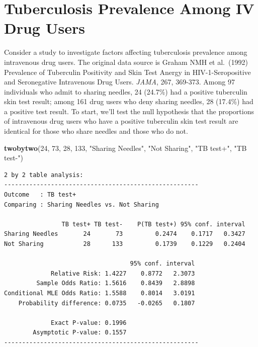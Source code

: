 \documentclass[
]{book}
\newenvironment{Shaded}{\begin{snugshade}}{\end{snugshade}}
\newcommand{\DecValTok}[1]{\textcolor[rgb]{0.00,0.00,0.81}{#1}}
\newcommand{\KeywordTok}[1]{\textcolor[rgb]{0.13,0.29,0.53}{\textbf{#1}}}
\newcommand{\NormalTok}[1]{#1}
\newcommand{\StringTok}[1]{\textcolor[rgb]{0.31,0.60,0.02}{#1}}
\begin{document}
\hypertarget{tuberculosis-prevalence-among-iv-drug-users}{%
\section{Tuberculosis Prevalence Among IV Drug Users}\label{tuberculosis-prevalence-among-iv-drug-users}}

Consider a study to investigate factors affecting tuberculosis prevalence among intravenous drug users. The original data source is Graham NMH et al.~(1992) Prevalence of Tuberculin Positivity and Skin Test Anergy in HIV-1-Seropositive and Seronegative Intravenous Drug Users. \emph{JAMA}, 267, 369-373. Among 97 individuals who admit to sharing needles, 24 (24.7\%) had a positive tuberculin skin test result; among 161 drug users who deny sharing needles, 28 (17.4\%) had a positive test result. To start, we'll test the null hypothesis that the proportions of intravenous drug users who have a positive tuberculin skin test result are identical for those who share needles and those who do not.

\begin{Shaded}
\begin{Highlighting}[]
\KeywordTok{twobytwo}\NormalTok{(}\DecValTok{24}\NormalTok{, }\DecValTok{73}\NormalTok{, }\DecValTok{28}\NormalTok{, }\DecValTok{133}\NormalTok{, }
         \StringTok{"Sharing Needles"}\NormalTok{, }\StringTok{"Not Sharing"}\NormalTok{, }
         \StringTok{"TB test+"}\NormalTok{, }\StringTok{"TB test-"}\NormalTok{)}
\end{Highlighting}
\end{Shaded}

\begin{verbatim}
2 by 2 table analysis: 
------------------------------------------------------ 
Outcome   : TB test+ 
Comparing : Sharing Needles vs. Not Sharing 

                TB test+ TB test-    P(TB test+) 95% conf. interval
Sharing Needles       24       73         0.2474    0.1717   0.3427
Not Sharing           28      133         0.1739    0.1229   0.2404

                                   95% conf. interval
             Relative Risk: 1.4227    0.8772   2.3073
         Sample Odds Ratio: 1.5616    0.8439   2.8898
Conditional MLE Odds Ratio: 1.5588    0.8014   3.0191
    Probability difference: 0.0735   -0.0265   0.1807

             Exact P-value: 0.1996 
        Asymptotic P-value: 0.1557 
------------------------------------------------------
\end{verbatim}
\end{document}
